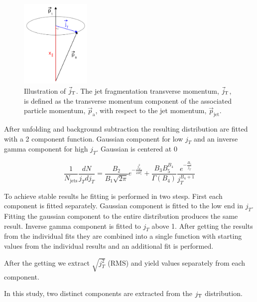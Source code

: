   
  \begin{figure}
    \begin{center}
      \includegraphics[width = 0.30\textwidth]{figures/jtwithrightangle}
    \end{center}
    \caption{Illustration of $\vec{j}_{\rm T}$. The jet fragmentation transverse momentum, $\vec{j}_{\rm T}$, is defined as the transverse momentum component of the associated particle momentum, $\vec{p}_{\mathrm{a}}$, with respect to the jet momentum, $\vec{p}_{\mathrm{jet}}$.}
    \label{fig:jtdefinition}
  \end{figure}


After unfolding and background subtraction the resulting distribution are fitted with a 2 component function. Gaussian component for low $j_T$ and an inverse gamma component for high $j_T$. Gaussian is centered at $0$

$$\frac{1}{N_{\mathrm{jets}}}\frac{dN}{j_T dj_T} = \frac{B_2}{B_1\sqrt{2\pi}}e^{-\frac{j_T^2}{2B_1^2}}+\frac{B_3B_5^{B_4}}{\Gamma\left(B_4\right)}\frac{e^{-\frac{B_5}{j_T}}}{j_T^{B_4+1}}$$

To achieve stable results he fitting is performed in two stesp. First each component is fitted separately. Gaussian component is fitted to the low end in $j_T$. Fitting the gaussian component to the entire distribution produces the same result. Inverse gamma component is fitted to $j_T$ above 1. After getting the results from the individual fits they are combined into a single function with starting values from the individual results and an additional fit is performed.

After the getting we extract $\sqrt{j_T^2}$ (RMS) and yield values separately from each component.

In this study, two distinct components are extracted from the $j_{\rm T}$ distribution. 

